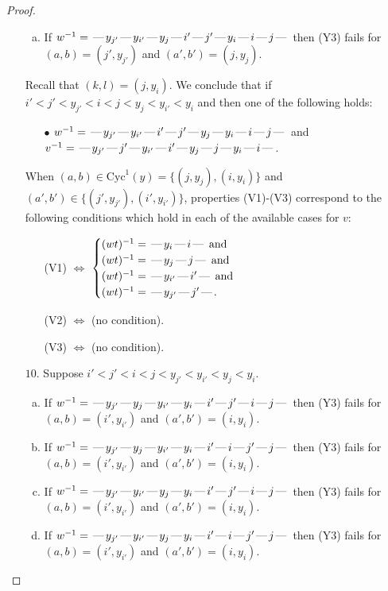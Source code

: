 \documentclass[10pt]{article}
\theoremstyle{definition}
\theoremstyle{definition}
\def\dash{\text{\hspace{0.5mm}---\hspace{0.5mm}}}
\def\Cyc{\mathrm{Cyc}}
\begin{document}
\begin{proof}
\begin{enumerate}
\begin{enumerate}[(a)]
\item If $w^{-1} = \dash y_{j'}\dash y_{i'}\dash y_j\dash i'\dash j'\dash y_i\dash i\dash j\dash $ then (Y3) fails for $(a,b)=(j',y_{j'})$ and $(a',b')=(j,y_j)$.
\end{enumerate}
Recall that $(k,l) = (j,y_i)$.
We conclude that if $i' < j' < y_{j'} < i < j < y_j < y_{i'} < y_i$ and then one of the following holds:
\begin{enumerate}
\item[$\bullet$] $w^{-1} = \dash y_{j'}\dash y_{i'}\dash i'\dash j'\dash y_j\dash y_i\dash i\dash j\dash $ and $v^{-1} = \dash y_{j'}\dash j'\dash y_{i'}\dash i'\dash y_j\dash j\dash y_i\dash i\dash $.
\end{enumerate}
When $(a,b)\in\Cyc^1(y)=\{(j,y_j),(i,y_i)\}$ and $(a',b')\in\{(j',y_{j'}),(i',y_{i'})\}$,
properties (V1)-(V3) correspond to the following conditions which hold in
each of the available cases for $v$:
\begin{enumerate}
\item[](V1) $\Leftrightarrow$ $\begin{cases}\text{$(wt)^{-1} = \dash y_i \dash i \dash$}\text{ and }\\
\text{$(wt)^{-1} = \dash y_j \dash j \dash$}\text{ and }\\
\text{$(wt)^{-1} = \dash y_{i'} \dash i' \dash$}\text{ and }\\
\text{$(wt)^{-1} = \dash y_{j'} \dash j' \dash$}.\end{cases}$
\item[](V2) $\Leftrightarrow$ (no condition).
\item[](V3) $\Leftrightarrow$ (no condition).
\end{enumerate}
\item[$10$.] Suppose $i' < j' < i < j < y_{j'} < y_{i'} < y_j < y_i$.
\begin{enumerate}[(a)]
\item If $w^{-1} = \dash y_{j'}\dash y_j\dash y_{i'}\dash y_i\dash i'\dash j'\dash i\dash j\dash $ then (Y3) fails for $(a,b)=(i',y_{i'})$ and $(a',b')=(i,y_i)$.
\item If $w^{-1} = \dash y_{j'}\dash y_j\dash y_{i'}\dash y_i\dash i'\dash i\dash j'\dash j\dash $ then (Y3) fails for $(a,b)=(i',y_{i'})$ and $(a',b')=(i,y_i)$.
\item If $w^{-1} = \dash y_{j'}\dash y_{i'}\dash y_j\dash y_i\dash i'\dash j'\dash i\dash j\dash $ then (Y3) fails for $(a,b)=(i',y_{i'})$ and $(a',b')=(i,y_i)$.
\item If $w^{-1} = \dash y_{j'}\dash y_{i'}\dash y_j\dash y_i\dash i'\dash i\dash j'\dash j\dash $ then (Y3) fails for $(a,b)=(i',y_{i'})$ and $(a',b')=(i,y_i)$.

\end{enumerate}
\end{enumerate}
\end{proof}
\end{document}
